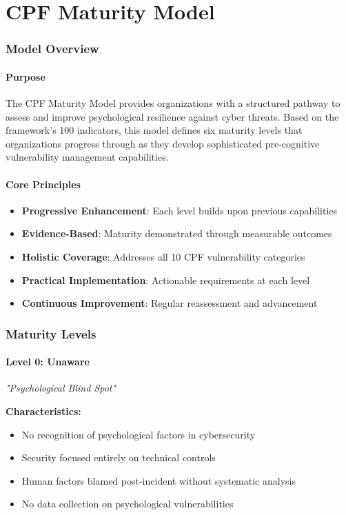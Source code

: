 \documentclass[11pt,a4paper]{article}
\begin{document}
\part{CPF Maturity Model}

\section{Model Overview}

\subsection{Purpose}

The CPF Maturity Model provides organizations with a structured pathway to assess and improve psychological resilience against cyber threats. Based on the framework's 100 indicators, this model defines six maturity levels that organizations progress through as they develop sophisticated pre-cognitive vulnerability management capabilities.

\subsection{Core Principles}

\begin{itemize}
\item \textbf{Progressive Enhancement}: Each level builds upon previous capabilities
\item \textbf{Evidence-Based}: Maturity demonstrated through measurable outcomes
\item \textbf{Holistic Coverage}: Addresses all 10 CPF vulnerability categories
\item \textbf{Practical Implementation}: Actionable requirements at each level
\item \textbf{Continuous Improvement}: Regular reassessment and advancement
\end{itemize}

\section{Maturity Levels}

\subsection{Level 0: Unaware}
\textit{"Psychological Blind Spot"}

\textbf{Characteristics:}
\begin{itemize}
\item No recognition of psychological factors in cybersecurity
\item Security focused entirely on technical controls
\item Human factors blamed post-incident without systematic analysis
\item No data collection on psychological vulnerabilities
\end{itemize}
\end{document}
